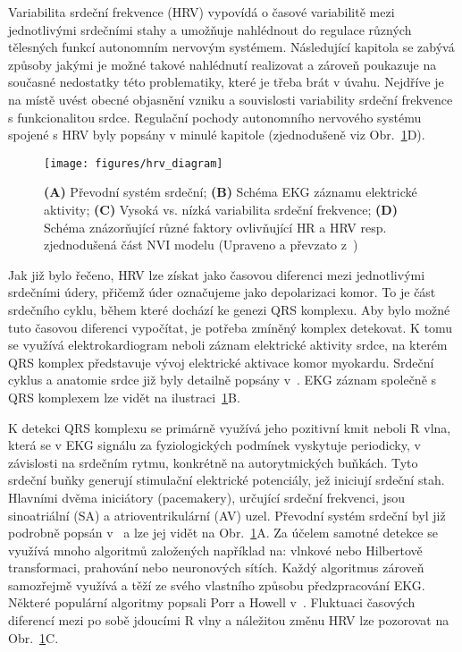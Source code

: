Variabilita srdeční frekvence (\gls{HRV}) vypovídá o časové variabilitě mezi
jednotlivými srdečními stahy a umožňuje nahlédnout do regulace různých tělesných
funkcí autonomním nervovým systémem. Následující kapitola se zabývá způsoby
jakými je možné takové nahlédnutí realizovat a zároveň poukazuje na současné
nedostatky této problematiky, které je třeba brát v úvahu. Nejdříve je na místě
uvést obecné objasnění vzniku a souvislosti variability srdeční frekvence s
funkcionalitou srdce. Regulační pochody autonomního nervového systému spojené s
\gls{HRV} byly popsány v minulé kapitole (zjednodušeně viz
Obr.~\ref{fig:hrv_diagram}D).

\begin{figure}[!htb]
    \begin{center}
        \texttt{[image: figures/hrv\_diagram]}
        \caption{\textbf{(A)} Převodní systém srdeční; \textbf{(B)} Schéma
            \gls{EKG} záznamu elektrické aktivity; \textbf{(C)} Vysoká vs. nízká
            variabilita srdeční frekvence; \textbf{(D)} Schéma znázorňující
            různé faktory ovlivňující \gls{HR} a \gls{HRV} resp. zjednodušená
            část \gls{NVI} modelu (Upraveno a převzato z~\cite{Lujan2021})}
        \label{fig:hrv_diagram}
    \end{center}
\end{figure}

Jak již bylo řečeno, \gls{HRV} lze získat jako časovou diferenci mezi jednotlivými
srdečními údery, přičemž úder označujeme jako depolarizaci komor. To je část
srdečního cyklu, během které dochází ke genezi QRS komplexu. Aby bylo možné tuto
časovou diferenci vypočítat, je potřeba zmíněný komplex detekovat. K tomu se
využívá elektrokardiogram neboli záznam elektrické aktivity srdce, na kterém QRS
komplex představuje vývoj elektrické aktivace komor myokardu. Srdeční cyklus a
anatomie srdce již byly detailně popsány v~\cite{Stejfa2006,Weinhaus2005,Cihak2016}.
EKG záznam společně s QRS komplexem lze vidět na ilustraci~\ref{fig:hrv_diagram}B.

K detekci QRS komplexu se primárně využívá jeho pozitivní kmit neboli R vlna,
která se v \gls{EKG} signálu za fyziologických podmínek vyskytuje periodicky, v
závislosti na srdečním rytmu, konkrétně na autorytmických buňkách. Tyto srdeční
buňky generují stimulační elektrické potenciály, jež iniciují srdeční stah.
Hlavními dvěma iniciátory (pacemakery), určující srdeční frekvenci, jsou
sinoatriální (\gls{SA}) a atrioventrikulární (\gls{AV}) uzel. Převodní systém
srdeční byl již podrobně popsán v~\cite{Stejfa2006,Weinhaus2005,Goldberger2017}
a lze jej vidět na Obr.~\ref{fig:hrv_diagram}A. Za účelem samotné detekce se
využívá mnoho algoritmů založených například na: vlnkové nebo Hilbertově
transformaci, prahování nebo neuronových sítích. Každý algoritmus zároveň
samozřejmě využívá a těží ze svého vlastního způsobu předzpracování EKG. Některé
populární algoritmy popsali Porr a Howell v~\cite{Porr2019}. Fluktuaci časových
diferencí mezi po sobě jdoucími R vlny a náležitou změnu HRV lze pozorovat na
Obr.~\ref{fig:hrv_diagram}C.

